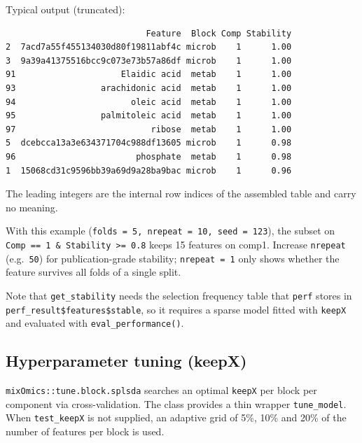\documentclass[
]{book}
\newenvironment{Shaded}{\begin{snugshade}}{\end{snugshade}}
\newcommand{\AttributeTok}[1]{\textcolor[rgb]{0.13,0.29,0.53}{#1}}
\newcommand{\DecValTok}[1]{\textcolor[rgb]{0.00,0.00,0.81}{#1}}
\newcommand{\FunctionTok}[1]{\textcolor[rgb]{0.13,0.29,0.53}{\textbf{#1}}}
\newcommand{\NormalTok}[1]{#1}
\newcommand{\SpecialCharTok}[1]{\textcolor[rgb]{0.81,0.36,0.00}{\textbf{#1}}}
\begin{document}
Typical output (truncated):

\begin{verbatim}
                            Feature  Block Comp Stability
2  7acd7a55f455134030d80f19811abf4c microb    1      1.00
3  9a39a41375516bcc9c073e73b57a86df microb    1      1.00
91                     Elaidic acid  metab    1      1.00
93                 arachidonic acid  metab    1      1.00
94                       oleic acid  metab    1      1.00
95                 palmitoleic acid  metab    1      1.00
97                           ribose  metab    1      1.00
5  dcebcca13a3e634371704c988df13605 microb    1      0.98
96                        phosphate  metab    1      0.98
1  15068cd31c9596bb39a69d9a28ba9bac microb    1      0.96
\end{verbatim}

The leading integers are the internal row indices of the assembled table and carry no meaning.

With this example (\texttt{folds\ =\ 5,\ nrepeat\ =\ 10,\ seed\ =\ 123}), the subset on \texttt{Comp\ ==\ 1\ \&\ Stability\ \textgreater{}=\ 0.8} keeps 15 features on comp1.
Increase \texttt{nrepeat} (e.g.~\texttt{50}) for publication-grade stability; \texttt{nrepeat\ =\ 1} only shows whether the feature survives all folds of a single split.

Note that \texttt{get\_stability} needs the selection frequency table that \texttt{perf} stores in \texttt{perf\_result\$features\$stable}, so it requires a sparse model fitted with \texttt{keepX} and evaluated with \texttt{eval\_performance()}.

\subsection{Hyperparameter tuning (keepX)}\label{hyperparameter-tuning-keepx}

\texttt{mixOmics::tune.block.splsda} searches an optimal \texttt{keepX} per block per component via cross-validation.
The class provides a thin wrapper \texttt{tune\_model}.
When \texttt{test\_keepX} is not supplied, an adaptive grid of 5\%, 10\% and 20\% of the number of features per block is used.

\begin{Shaded}
\end{Shaded}
\end{document}
